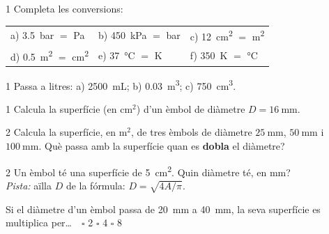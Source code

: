 \begin{exercici}{1}
Completa les conversions:\\[0.4em]
\begin{tabular}{@{}lll@{}}
a) \SI{3,5}{\bar} $=$ \underline{\hspace{2.5cm}} \si{\pascal} & b) \SI{450}{\kilo\pascal} $=$ \underline{\hspace{2.5cm}} \si{\bar} & c) \SI{12}{\centi\meter\squared} $=$ \underline{\hspace{2.5cm}} \si{\meter\squared}\\[0.7em]
d) \SI{0,5}{\meter\squared} $=$ \underline{\hspace{2.5cm}} \si{\centi\meter\squared} & e) \SI{37}{\degreeCelsius} $=$ \underline{\hspace{2.5cm}} \si{\kelvin} & f) \SI{350}{\kelvin} $=$ \underline{\hspace{2.5cm}} \si{\degreeCelsius}
\end{tabular}
\end{exercici}

\begin{exercici}{1}
Passa a litres: a) \SI{2500}{\milli\liter}; b) \SI{0,03}{\meter\cubed}; c) \SI{750}{\centi\meter\cubed}.
\end{exercici}

\begin{exercici}{1}
Calcula la superfície (en cm$^2$) d'un èmbol de diàmetre $D = \SI{16}{\milli\meter}$.
\end{exercici}

\begin{exercici}{2}
Calcula la superfície, en m$^2$, de tres èmbols de diàmetre $\SI{25}{\milli\meter}$, $\SI{50}{\milli\meter}$ i $\SI{100}{\milli\meter}$. Què passa amb la superfície quan es \textbf{dobla} el diàmetre?
\end{exercici}

\begin{exercici}{2}
Un èmbol té una superfície de \SI{5}{\centi\meter\squared}. Quin diàmetre té, en mm?\\
\emph{Pista:} aïlla $D$ de la fórmula: $D = \sqrt{4A/\pi}$.
\end{exercici}

\begin{comprova}
Si el diàmetre d'un èmbol passa de \SI{20}{\milli\meter} a \SI{40}{\milli\meter}, la seva superfície es multiplica per\ldots\ \ $\square$ 2 \quad $\square$ 4 \quad $\square$ 8
\end{comprova}

